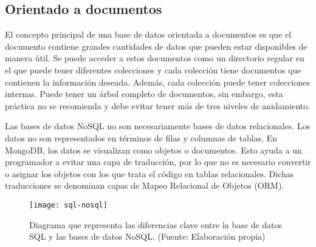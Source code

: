 \subsection{Orientado a documentos}
El concepto principal de una base de datos orientada a documentos es que el documento contiene grandes cantidades de datos que pueden estar disponibles de manera útil. Se puede acceder a estos documentos como un directorio regular en el que puede tener diferentes colecciones y cada colección tiene documentos que contienen la información deseada. Además, cada colección puede tener colecciones internas. Puede tener un árbol completo de documentos, sin embargo, esta práctica no se recomienda y debe evitar tener más de tres niveles de anidamiento. 
\vspace{0.8cm}

Las bases de datos NoSQL no son necesariamente bases de datos relacionales. Los datos no son representados en términos de filas y columnas de tablas. En MongoDB, los datos se visualizan como objetos o documentos. Esto ayuda a un programador a evitar una capa de traducción, por lo que no es necesario convertir o asignar los objetos con los que trata el código en tablas relacionales. Dichas traducciones se denominan capas de Mapeo Relacional de Objetos (ORM).
\begin{figure}[H]
  \centering
  \texttt{[image: sql-nosql]}
  \caption{Diagrama que representa las diferencias clave entre la base de datos SQL y las bases de datos NoSQL. (Fuente: Elaboración propia)}
\end{figure}